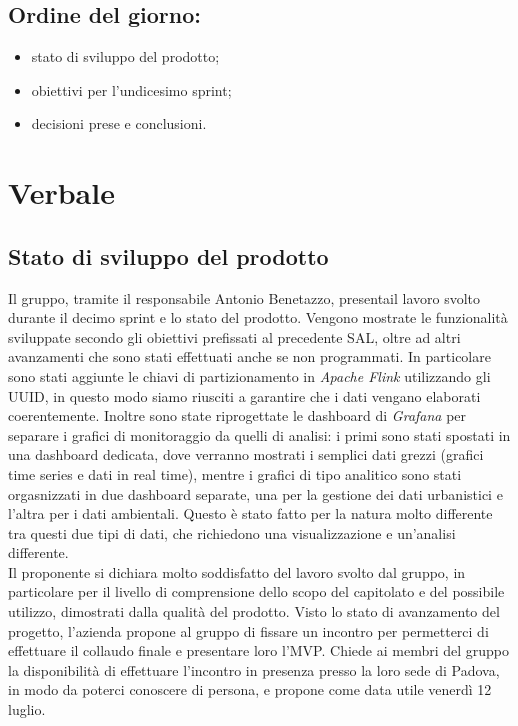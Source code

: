 \documentclass[italian,12pt]{article}
\begin{document}
\subsection*{Ordine del giorno:}
\begin{itemize}
	\item stato di sviluppo del prodotto;
	\item obiettivi per l'undicesimo sprint;
	\item decisioni prese e conclusioni.
\end{itemize}

\newpage

\section{Verbale}

\subsection{Stato di sviluppo del prodotto}
Il gruppo, tramite il responsabile Antonio Benetazzo, presentail lavoro svolto durante il decimo sprint e lo stato del prodotto. Vengono mostrate le funzionalità sviluppate secondo gli obiettivi prefissati al precedente SAL, oltre ad altri avanzamenti che sono stati effettuati anche se non programmati. In particolare sono stati aggiunte le chiavi di partizionamento in \textit{Apache Flink} utilizzando gli UUID, in questo modo siamo riusciti a garantire che i dati vengano elaborati coerentemente. Inoltre sono state riprogettate le dashboard di \textit{Grafana} per separare i grafici di monitoraggio da quelli di analisi: i primi sono stati spostati in una dashboard dedicata, dove verranno mostrati i semplici dati grezzi (grafici time series e dati in real time), mentre i grafici di tipo analitico sono stati orgasnizzati in due dashboard separate, una per la gestione dei dati urbanistici e l'altra per i dati ambientali. Questo è stato fatto per la natura molto differente tra questi due tipi di dati, che richiedono una visualizzazione e un'analisi differente. \\
Il proponente si dichiara molto soddisfatto del lavoro svolto dal gruppo, in particolare per il livello di comprensione dello scopo del capitolato e del possibile utilizzo, dimostrati dalla qualità del prodotto. Visto lo stato di avanzamento del progetto, l'azienda propone al gruppo di fissare un incontro per permetterci di effettuare il collaudo finale e presentare loro l'MVP. Chiede ai membri del gruppo la disponibilità di effettuare l'incontro in presenza presso la loro sede di Padova, in modo da poterci conoscere di persona, e propone come data utile venerdì 12 luglio.
\end{document}
